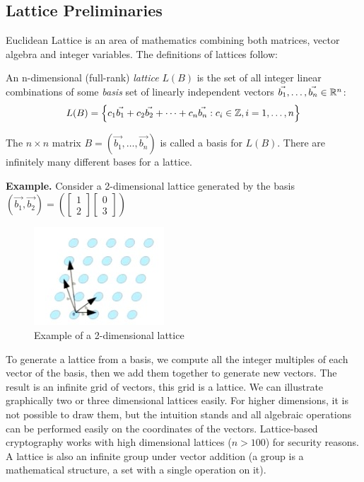 \subsection{Lattice Preliminaries}
\label{ssub:The mathematics}
Euclidean Lattice is an area of mathematics combining both matrices, vector algebra
and integer variables. The definitions of lattices follow:

\begin{definition}[Lattice]
  An n-dimensional (full-rank) \emph{lattice} $L(B)$ is the set of all integer
  linear combinations of some \emph{basis} set of linearly independent vectors
  $\vec{b_1},\dots,\vec{b_n} \in \mathbb{R}^n$:
  \[
    L(B) = \left\{ c_1 \vec{b_1} + c_2 \vec{b_2} + \dots + c_n \vec{b_n} : c_i
      \in \mathbb{Z}, i = 1, \dots, n \right\}
  \]
\end{definition}
The $ n \times n$ matrix $B = (\vec{b_1},\dots, \vec{b_n})$ is called a basis
  for $L(B)$. There are infinitely many different bases for a lattice.

\textbf{Example.} Consider a 2-dimensional lattice generated by the basis
$(\vec{b_1}, \vec{b_2}) = \left( \begin{bmatrix} 1 \\ 2
  \end{bmatrix} \begin{bmatrix} 0 \\ 3
  \end{bmatrix}\right)$
\begin{figure}[h]
  \centering \includegraphics{lattices}
  \caption{Example of a 2-dimensional lattice}
  \label{fig:2dimLattice}
\end{figure}
To generate a lattice from a basis, we compute all the integer multiples of
each vector of the basis, then we add them together to generate new vectors. The
result is an infinite grid of vectors, this grid is a lattice. We can illustrate graphically
two or three dimensional lattices easily. For higher dimensions, it is not
possible to draw them, but the intuition stands and all 
algebraic operations can be performed easily on the coordinates of the vectors. Lattice-based cryptography works with high dimensional lattices ($n > 100$) for
security reasons. A lattice is also an infinite
group under vector addition (a group is a mathematical structure, a set with a single operation on it).

